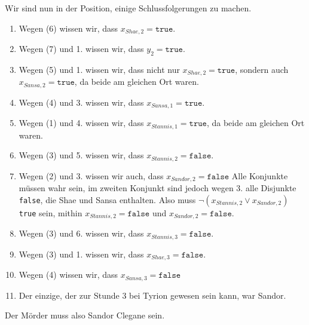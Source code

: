 \documentclass{article}
\begin{document}
Wir sind nun in der Position, einige Schlussfolgerungen zu machen.
\renewcommand{\labelenumi}{\arabic{enumi}.}
\begin{enumerate}
   \item Wegen (6) wissen wir, dass $x_{Shae,2}=\texttt{true}$.
   \item Wegen (7) und 1. wissen wir, dass $y_2 = \texttt{true}$.
   \item Wegen (5) und 1. wissen wir, dass nicht nur $x_{Shae,2}=\texttt{true}$,
      sondern auch $x_{Sansa,2}=\texttt{true}$, da beide am gleichen Ort waren.
   \item Wegen (4) und 3. wissen wir, dass $x_{Sansa,1}=\texttt{true}$.
   \item Wegen (1) und 4. wissen wir, dass $x_{Stannis,1}=\texttt{true}$, da
      beide am gleichen Ort waren.
   \item Wegen (3) und 5. wissen wir, dass $x_{Stannis,2}=\texttt{false}$. 
   \item Wegen (2) und 3. wissen wir auch, dass $x_{Sandor,2}=\texttt{false}$ 
      Alle Konjunkte
      müssen wahr sein, im zweiten Konjunkt sind jedoch wegen 3. alle Disjunkte
      \texttt{false}, die Shae und Sansa enthalten. Also muss
      $\neg(x_{Stannis,2} \vee x_{Sandor,2})$ \texttt{true} sein, mithin
      $x_{Stannis,2}=\texttt{false}$ und $x_{Sandor,2}=\texttt{false}$. 
   \item Wegen (3) und 6. wissen wir, dass $x_{Stannis,3}=\texttt{false}$.
   \item Wegen (3) und 1. wissen wir, dass $x_{Shae,3}=\texttt{false}$.
   \item Wegen (4) wissen wir, dass $x_{Sansa,3}=\texttt{false}$
   \item Der einzige, der zur Stunde 3 bei Tyrion gewesen sein kann, war Sandor.
\end{enumerate}

Der Mörder muss also Sandor Clegane sein.

\end{document}
